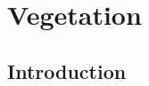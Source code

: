 \documentclass[11pt]{book}
\begin{document}
%
%
%
%
%
%

\clearpage

\chapter{Vegetation}

\section{Introduction}
\end{document}
